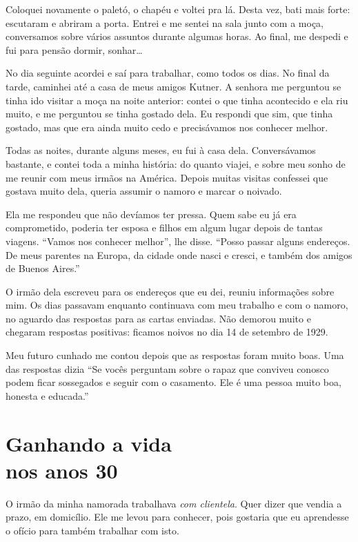 Coloquei novamente o paletó, o chapéu e voltei pra lá. Desta vez, bati mais
forte: escutaram e abriram a porta. Entrei e me sentei na sala junto com a moça, 
conversamos sobre vários assuntos durante algumas horas. Ao final, me
despedi e fui para pensão dormir, sonhar\ldots

No dia seguinte acordei e saí para trabalhar, como todos os dias. No final da tarde,
caminhei até a casa de meus amigos Kutner. A senhora me perguntou se
tinha ido visitar a moça na noite anterior: contei o que tinha
acontecido e ela riu muito, e me perguntou se tinha gostado dela. Eu respondi 
que sim, que tinha gostado, mas que era ainda muito
cedo e precisávamos nos conhecer melhor.

Todas as noites, durante alguns meses, eu fui à casa dela.
Conversávamos bastante, e contei toda a minha história: do quanto viajei, e
sobre meu sonho de me reunir com meus irmãos na América. Depois muitas visitas 
confessei que gostava muito dela, queria assumir o namoro e
marcar o noivado.

Ela me respondeu que não devíamos ter pressa. Quem sabe eu já era
comprometido, poderia ter esposa e filhos em algum lugar depois de tantas viagens. 
``Vamos nos conhecer melhor'', lhe disse. ``Posso passar alguns endereços. De meus parentes na Europa, da
cidade onde nasci e cresci, e também dos amigos de Buenos Aires.''

O irmão dela escreveu para os endereços que eu dei, reuniu informações
sobre mim. Os dias passavam enquanto continuava com meu
trabalho e com o namoro, no aguardo das respostas para as cartas enviadas. Não
demorou muito e chegaram respostas positivas: ficamos noivos no dia 14 de
setembro de 1929.

Meu futuro cunhado me contou depois que as respostas foram muito
boas. Uma das respostas dizia ``Se vocês perguntam sobre o rapaz que conviveu
conosco podem ficar sossegados e seguir com o casamento. Ele é uma pessoa
muito boa, honesta e educada.''

\chapter*{Ganhando a vida\\nos anos 30}

O irmão da minha namorada trabalhava \textit{com clientela}. Quer dizer que vendia a
prazo, em domicílio. Ele me levou para conhecer, pois gostaria que eu aprendesse o ofício
para também trabalhar com isto.

